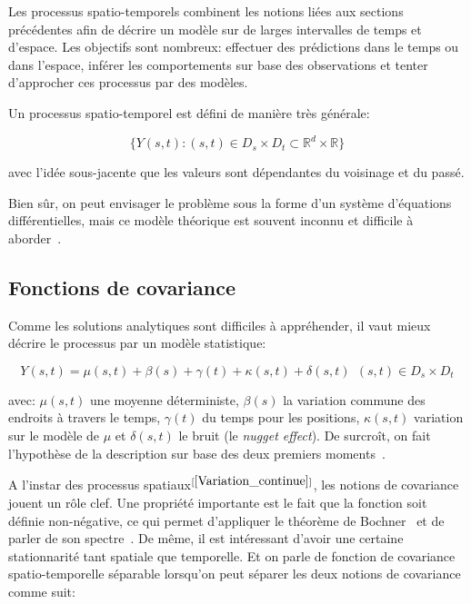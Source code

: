 Les processus spatio-temporels combinent les notions liées aux sections précédentes afin de décrire un modèle sur de larges intervalles de temps et d'espace. Les objectifs sont nombreux: effectuer des prédictions dans le temps ou dans l'espace, inférer les comportements sur base des observations et tenter d'approcher ces processus par des modèles.

Un processus spatio-temporel est défini de manière très générale:

\begin{equation}
    \{ Y(s, t): (s, t) \in D_{s} \times D_{t} \subset \mathbb{R}^{d} \times \mathbb{R} \}
\end{equation}

avec l'idée sous-jacente que les valeurs sont dépendantes du voisinage et du passé.

Bien sûr, on peut envisager le problème sous la forme d'un système d'équations différentielles, mais ce modèle théorique est souvent inconnu et difficile à aborder~\cite{gelfand2010handbook}.

\subsection{Fonctions de covariance}

Comme les solutions analytiques sont difficiles à appréhender, il vaut mieux décrire le processus par un modèle statistique:

\begin{equation}
    Y(s, t) = \mu(s, t) + \beta(s) + \gamma(t) + \kappa(s, t) + \delta(s, t) ~~ (s, t) \in D_{s} \times D_{t}
\end{equation}

avec: $\mu(s, t)$ une moyenne déterministe, $\beta(s)$ la variation commune des endroits à travers le temps, $\gamma(t)$ du temps pour les positions, $\kappa(s, t)$ variation sur le modèle de $\mu$ et $\delta(s, t)$ le bruit (le \textit{nugget effect}). De surcroît, on fait l'hypothèse de la description sur base des deux premiers moments~\cite{wikle2003bf}.

A l'instar des processus spatiaux$^{[\ref{Variation_continue}]}$, les notions de covariance jouent un rôle clef. Une propriété importante est le fait que la fonction soit définie non-négative, ce qui permet d'appliquer le théorème de Bochner~\cite{cressie1999classes} et de parler de son spectre~\cite{stein2012interpolation}. De même, il est intéressant d'avoir une certaine stationnarité tant spatiale que temporelle. Et on parle de fonction de covariance spatio-temporelle séparable lorsqu'on peut séparer les deux notions de covariance comme suit:

